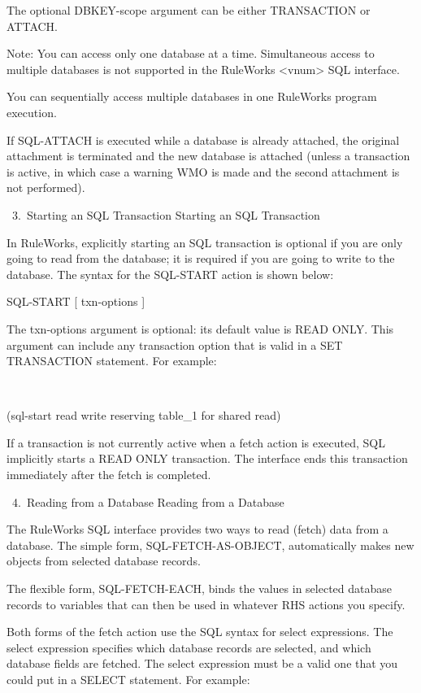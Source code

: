      The optional DBKEY-scope argument can be
     either TRANSACTION or ATTACH.

     Note: You can access only one database at a
     time. Simultaneous access to multiple
     databases is not supported in the RuleWorks
     <vnum> SQL interface.

     You can sequentially access multiple databases
     in one RuleWorks program execution.

     If SQL-ATTACH is executed while a database is
     already attached, the original attachment is
     terminated and the new database is attached
     (unless a transaction is active, in which case
     a warning WMO is made and the second
     attachment is not performed).

  3. Starting an SQL Transaction Starting an SQL
     Transaction

     In RuleWorks, explicitly starting an SQL
     transaction is optional if you are only going
     to read from the database; it is required if
     you are going to write to the database. The
     syntax for the SQL-START action is shown
     below:

     SQL-START [ txn-options ]

     The txn-options argument is optional: its
     default value is READ ONLY. This argument can
     include any transaction option that is valid
     in a SET TRANSACTION statement. For example:

      

     (sql-start read write reserving table_1 for
     shared read)

     If a transaction is not currently active when
     a fetch action is executed, SQL implicitly
     starts a READ ONLY transaction. The interface
     ends this transaction immediately after the
     fetch is completed.

  4. Reading from a Database Reading from a
     Database

     The RuleWorks SQL interface provides two ways
     to read (fetch) data from a database. The
     simple form, SQL-FETCH-AS-OBJECT,
     automatically makes new objects from selected
     database records.

     The flexible form, SQL-FETCH-EACH, binds the
     values in selected database records to
     variables that can then be used in whatever
     RHS actions you specify.

     Both forms of the fetch action use the SQL
     syntax for select expressions. The select
     expression specifies which database records
     are selected, and which database fields are
     fetched. The select expression must be a valid
     one that you could put in a SELECT statement.
     For example:

